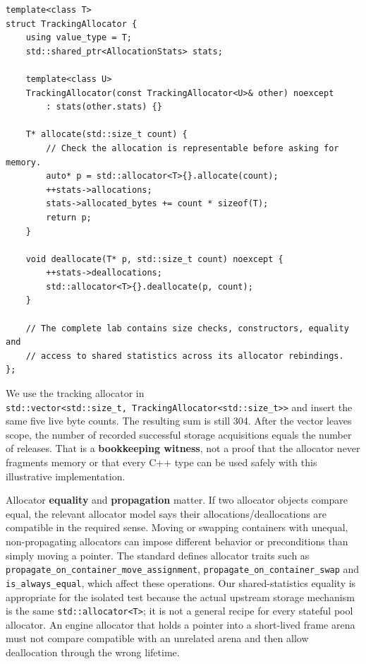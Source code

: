 \begin{verbatim}
template<class T>
struct TrackingAllocator {
    using value_type = T;
    std::shared_ptr<AllocationStats> stats;

    template<class U>
    TrackingAllocator(const TrackingAllocator<U>& other) noexcept
        : stats(other.stats) {}

    T* allocate(std::size_t count) {
        // Check the allocation is representable before asking for memory.
        auto* p = std::allocator<T>{}.allocate(count);
        ++stats->allocations;
        stats->allocated_bytes += count * sizeof(T);
        return p;
    }

    void deallocate(T* p, std::size_t count) noexcept {
        ++stats->deallocations;
        std::allocator<T>{}.deallocate(p, count);
    }

    // The complete lab contains size checks, constructors, equality and
    // access to shared statistics across its allocator rebindings.
};
\end{verbatim}

We use the tracking allocator in \texttt{std::vector\textless{}std::size\_t,\ TrackingAllocator\textless{}std::size\_t\textgreater{}\textgreater{}} and insert the same five live byte counts. The resulting sum is still 304. After the vector leaves scope, the number of recorded successful storage acquisitions equals the number of releases. That is a \textbf{bookkeeping witness}, not a proof that the allocator never fragments memory or that every C++ type can be used safely with this illustrative implementation.

Allocator \textbf{equality} and \textbf{propagation} matter. If two allocator objects compare equal, the relevant allocator model says their allocations/deallocations are compatible in the required sense. Moving or swapping containers with unequal, non-propagating allocators can impose different behavior or preconditions than simply moving a pointer. The standard defines allocator traits such as \texttt{propagate\_on\_container\_move\_assignment}, \texttt{propagate\_on\_container\_swap} and \texttt{is\_always\_equal}, which affect these operations. Our shared-statistics equality is appropriate for the isolated test because the actual upstream storage mechanism is the same \texttt{std::allocator\textless{}T\textgreater{}}; it is not a general recipe for every stateful pool allocator. An engine allocator that holds a pointer into a short-lived frame arena must not compare compatible with an unrelated arena and then allow deallocation through the wrong lifetime.

